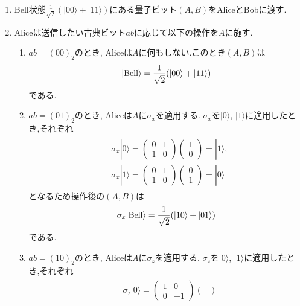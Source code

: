 \documentclass[uplatex,a4j,11pt,dvipdfmx]{jsarticle}
\begin{document}
\begin{enumerate}
  \item Bell状態$\frac{1}{\sqrt{2}}(|00\rangle+|11\rangle)$にある量子ビット$(A,B)$をAliceとBobに渡す.
  \item Aliceは送信したい古典ビット$ab$に応じて以下の操作を$A$に施す.
  \begin{enumerate}
    \item $ab=(00)_2$のとき, Aliceは$A$に何もしない.このとき$(A,B)$は
    \begin{align}
      |{\rm Bell}\rangle=\frac{1}{\sqrt{2}}(|00\rangle+|11\rangle)
    \end{align}
    である.
    \item $ab=(01)_2$のとき, Aliceは$A$に$\sigma_x$を適用する.
    $\sigma_x$を$|0\rangle$, $|1\rangle$に適用したとき,それぞれ
    \begin{align}
      \begin{split}
        &\sigma_x|0\rangle=\begin{pmatrix}
          0&1\\1&0
        \end{pmatrix}\begin{pmatrix}
          1\\0
        \end{pmatrix}=|1\rangle,\\
        &\sigma_x|1\rangle=\begin{pmatrix}
          0&1\\1&0
        \end{pmatrix}\begin{pmatrix}
          0\\1
        \end{pmatrix}=|0\rangle
      \end{split}
    \end{align}
    となるため操作後の$(A,B)$は
    \begin{align}
      \sigma_x|{\rm Bell}\rangle=\frac{1}{\sqrt{2}}(|10\rangle+|01\rangle)
    \end{align}
    である.
    \newpage
    \item $ab=(10)_2$のとき, Aliceは$A$に$\sigma_z$を適用する.
    $\sigma_z$を$|0\rangle$, $|1\rangle$に適用したとき,それぞれ
    \begin{align}
      \begin{split}
        &\sigma_z|0\rangle=\begin{pmatrix}
          1&0\\0&-1
        \end{pmatrix}\begin{pmatrix}

\end{pmatrix}
\end{split}
\end{align}
\end{enumerate}
\end{enumerate}
\end{document}
